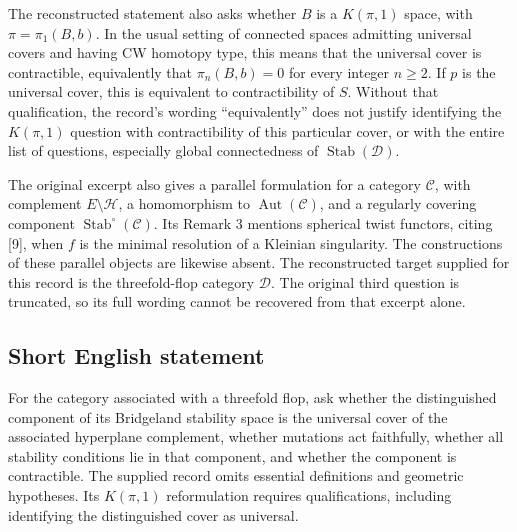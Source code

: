 \documentclass[11pt]{article}
\begin{document}
The reconstructed statement also asks whether \(B\) is a \(K(\pi,1)\) space, with \(\pi=\pi_1(B,b)\). In the usual setting of connected spaces admitting universal covers and having CW homotopy type, this means that the universal cover is contractible, equivalently that \(\pi_n(B,b)=0\) for every integer \(n\geq2\). If \(p\) is the universal cover, this is equivalent to contractibility of \(S\). Without that qualification, the record's wording ``equivalently'' does not justify identifying the \(K(\pi,1)\) question with contractibility of this particular cover, or with the entire list of questions, especially global connectedness of \(\operatorname{Stab}(\mathcal D)\).

The original excerpt also gives a parallel formulation for a category \(\mathcal C\), with complement \(E\setminus\mathcal H\), a homomorphism to \(\operatorname{Aut}(\mathcal C)\), and a regularly covering component \(\operatorname{Stab}^{\circ}(\mathcal C)\). Its Remark 3 mentions spherical twist functors, citing [9], when \(f\) is the minimal resolution of a Kleinian singularity. The constructions of these parallel objects are likewise absent. The reconstructed target supplied for this record is the threefold-flop category \(\mathcal D\). The original third question is truncated, so its full wording cannot be recovered from that excerpt alone.
\subsection{Short English statement}
For the category associated with a threefold flop, ask whether the distinguished component of its Bridgeland stability space is the universal cover of the associated hyperplane complement, whether mutations act faithfully, whether all stability conditions lie in that component, and whether the component is contractible. The supplied record omits essential definitions and geometric hypotheses. Its \(K(\pi,1)\) reformulation requires qualifications, including identifying the distinguished cover as universal.
\end{document}
